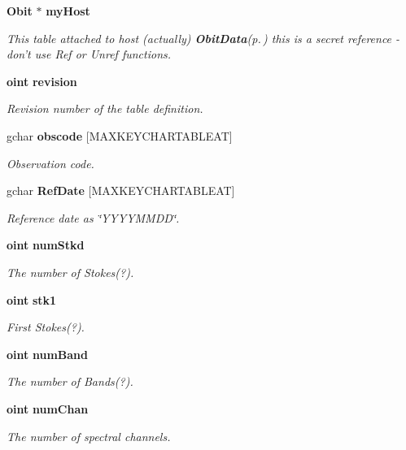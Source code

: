 \begin{CompactItemize}
{\bf Obit} $\ast$ {\bf my\-Host}
\begin{CompactList}\small\item\em This table attached to host (actually) {\bf Obit\-Data}{\rm (p.\,\pageref{structObitData})} this is a secret reference - don't use Ref or Unref functions. \item\end{CompactList}\item 
{\bf oint} {\bf revision}
\begin{CompactList}\small\item\em Revision number of the table definition. \item\end{CompactList}\item 
gchar {\bf obscode} [MAXKEYCHARTABLEAT]
\begin{CompactList}\small\item\em Observation code. \item\end{CompactList}\item 
gchar {\bf Ref\-Date} [MAXKEYCHARTABLEAT]
\begin{CompactList}\small\item\em Reference date as \char`\"{}YYYYMMDD\char`\"{}. \item\end{CompactList}\item 
{\bf oint} {\bf num\-Stkd}
\begin{CompactList}\small\item\em The number of Stokes(?). \item\end{CompactList}\item 
{\bf oint} {\bf stk1}
\begin{CompactList}\small\item\em First Stokes(?). \item\end{CompactList}\item 
{\bf oint} {\bf num\-Band}
\begin{CompactList}\small\item\em The number of Bands(?). \item\end{CompactList}\item 
{\bf oint} {\bf num\-Chan}
\begin{CompactList}\small\item\em The number of spectral channels. \item\end{CompactList}\item 

\end{CompactItemize}

